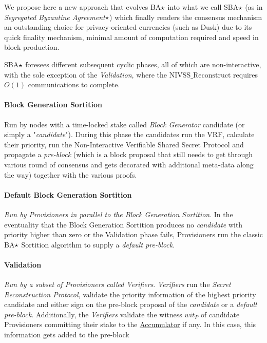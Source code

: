 We propose here a new approach that evolves BA$\large\star$ into what we call SBA$\large\star$ (as in \textit{Segregated Byzantine Agreement}$\large\star$) which finally renders the consensus mechanism an outstanding choice for privacy-oriented currencies (such as \textrm{Dusk}) due to its quick finality mechanism, minimal amount of computation required and speed in block production.

SBA$\large\star$ foresees different subsequent cyclic phases, all of which are non-interactive, with the sole exception of the \textit{Validation}, where the $\textrm{NIVSS\_Reconstruct}$ requires $O(1)$ communications to complete.
\paragraph*{Block Generation Sortition} Run by nodes with a time-locked stake called \textit{Block Generator} candidate (or simply a "\textit{candidate}"). During this phase the candidates run the VRF, calculate their priority, run the Non-Interactive Verifiable Shared Secret Protocol and propagate a \textit{pre-block} (which is a block proposal that still needs to get through various round of consensus and gets decorated with additional meta-data along the way) together with the various proofs.

\paragraph*{Default Block Generation Sortition} 
\textit{Run by Provisioners in parallel to the Block Generation Sortition}. In the eventuality that the Block Generation Sortition produces no \textit{candidate} with priority higher than zero or the Validation phase fails, Provisioners run the classic BA$\large\star$ Sortition algorithm to supply a \textit{default pre-block}.  
\paragraph*{Validation}
\textit{Run by a subset of Provisioners called Verifiers}. \textit{Verifiers} run the \textit{Secret Reconstruction Protocol}, validate the priority information of the highest priority candidate and either sign on the pre-block proposal of the \textit{candidate} or a \textit{default pre-block}. Additionally, the \textit{Verifiers} validate the witness $wit_P$ of candidate Provisioners committing their stake to the \hyperref[sec:Cryptographically-Committed-Provisioners]{Accumulator} if any. In this case, this information gets added to the pre-block
